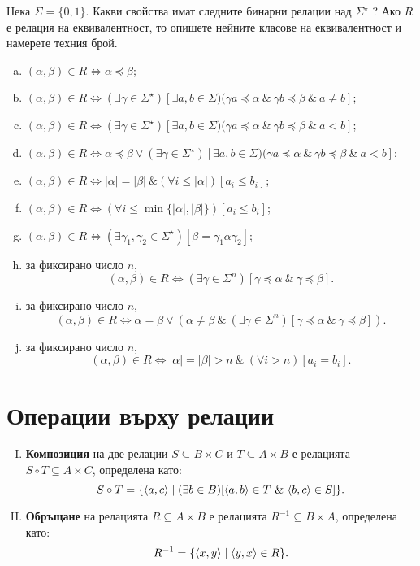\begin{problem}
  Нека $\Sigma = \{0,1\}$.
  Какви свойства имат следните бинарни релации над $\Sigma^\star$ ?
  Ако $R$ е релация на  еквивалентност, то опишете нейните класове на еквивалентност 
  и намерете техния брой.
  \begin{enumerate}[a)]
  \item
    $(\alpha,\beta) \in R \iff \alpha \preceq \beta$;
  \item
    $(\alpha,\beta) \in R  \iff (\exists\gamma\in \Sigma^\star)[\exists a,b\in \Sigma)(\gamma a \preceq \alpha\ \&\ \gamma b \preceq \beta\ \&\ a \neq b]$;
  \item
    $(\alpha,\beta) \in R  \iff (\exists\gamma\in \Sigma^\star)[\exists a,b\in \Sigma)(\gamma a \preceq \alpha\ \&\ \gamma b \preceq \beta\ \&\ a < b]$;
  \item
    $(\alpha,\beta) \in R  \iff \alpha \preceq \beta \vee (\exists\gamma\in \Sigma^\star)[\exists a,b\in \Sigma)(\gamma a \preceq \alpha\ \&\ \gamma b \preceq \beta\ \&\ a < b]$;
  \item
    $(\alpha,\beta) \in R \iff |\alpha| = |\beta|\ \& (\forall i \leq |\alpha|)[a_i \leq b_i]$;
  \item
    $(\alpha,\beta) \in R \iff (\forall i \leq \min\{|\alpha|,|\beta|\})[a_i \leq b_i]$;
  \item
    $(\alpha,\beta) \in R \iff (\exists \gamma_1,\gamma_2 \in \Sigma^\star)[\beta = \gamma_1 \alpha \gamma_2]$;
  \item
    за фиксирано число $n$,
    \[(\alpha,\beta) \in R \iff (\exists\gamma\in\Sigma^n)[\gamma\preceq\alpha\ \&\ \gamma\preceq\beta].\]
  \item
    за фиксирано число $n$,
    \[(\alpha,\beta) \in R \iff \alpha = \beta \vee (\alpha \neq \beta\ \&\ (\exists\gamma\in\Sigma^n)[\gamma\preceq\alpha\ \&\ \gamma\preceq\beta]).\]
  \item
    за фиксирано число $n$,
    \[(\alpha, \beta)\in R \iff |\alpha| = |\beta| > n\ \&\ (\forall i > n)[a_i = b_i].\]
  \end{enumerate}
\end{problem}
\newpage
\section{Операции върху релации}
\begin{enumerate}[I)]
\item
  {\bf Композиция} на две релации $S \subseteq B\times C$ и $T \subseteq A\times B$ е релацията $S\circ T \subseteq A\times C$,
  определена като:
  \[S\circ T = \{\langle{a,c}\rangle \mid (\exists b \in B)[\pair{a,b}\in T\ \&\ \pair{b,c} \in S]\}.\]
\item
  {\bf Обръщане} на релацията $R \subseteq A\times B$ е релацията $R^{-1}\subseteq B\times A$, 
  определена като:
  \[R^{-1} = \{\langle{x,y}\rangle \mid \langle{y,x}\rangle \in R\}.\]
  
\end{enumerate}

